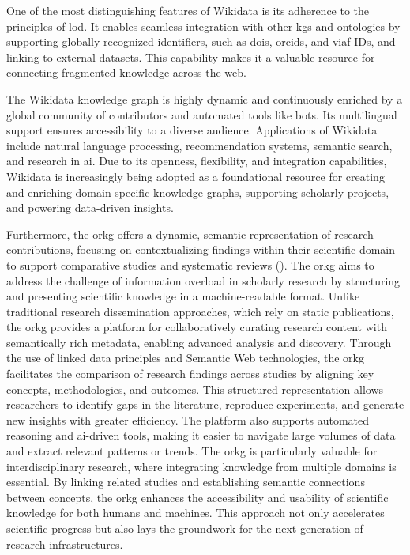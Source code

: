 One of the most distinguishing features of Wikidata is its adherence to the principles of \gls{lod}.
It enables seamless integration with other \glspl{kg} and ontologies by supporting globally recognized identifiers, such as \glspl{doi}, \glspl{orcid}, and \gls{viaf} IDs, and linking to external datasets.
This capability makes it a valuable resource for connecting fragmented knowledge across the web.

The Wikidata knowledge graph is highly dynamic and continuously enriched by a global community of contributors and automated tools like bots.
Its multilingual support ensures accessibility to a diverse audience.
Applications of Wikidata include natural language processing, recommendation systems, semantic search, and research in \gls{ai}.
Due to its openness, flexibility, and integration capabilities, Wikidata is increasingly being adopted as a foundational resource for creating and enriching domain-specific knowledge graphs, supporting scholarly projects, and powering data-driven insights.

Furthermore, the \gls{orkg} offers a dynamic, semantic representation of research contributions, focusing on contextualizing findings within their scientific domain to support comparative studies and systematic reviews (\cite{ORKG}).
The \gls{orkg} aims to address the challenge of information overload in scholarly research by structuring and presenting scientific knowledge in a machine-readable format.
Unlike traditional research dissemination approaches, which rely on static publications, the \gls{orkg} provides a platform for collaboratively curating research content with semantically rich metadata, enabling advanced analysis and discovery.
Through the use of linked data principles and Semantic Web technologies, the \gls{orkg} facilitates the comparison of research findings across studies by aligning key concepts, methodologies, and outcomes.
This structured representation allows researchers to identify gaps in the literature, reproduce experiments, and generate new insights with greater efficiency.
The platform also supports automated reasoning and \gls{ai}-driven tools, making it easier to navigate large volumes of data and extract relevant patterns or trends.
The \gls{orkg} is particularly valuable for interdisciplinary research, where integrating knowledge from multiple domains is essential.
By linking related studies and establishing semantic connections between concepts, the \gls{orkg} enhances the accessibility and usability of scientific knowledge for both humans and machines.
This approach not only accelerates scientific progress but also lays the groundwork for the next generation of research infrastructures.

